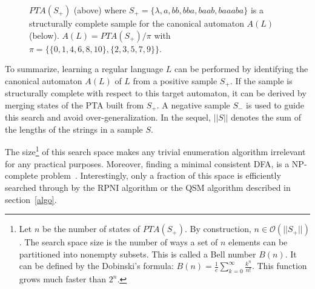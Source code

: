 \begin{figure}[H]
\begin{center}
\caption{$PTA(S_+)$ (above) where $S_+ = \{\lambda,a,bb,bba,baab,baaaba\}$ is a structurally complete sample 
for the canonical automaton $A(L)$ (below). $A(L) = PTA(S_+)/\pi$ with $\pi=\{\{0,1,4,6,8,10\},\{2,3,5,7,9\}\}$.\label{fig:pta:quotient}}
\end{center}
\end{figure}

To summarize, learning a regular language $L$ can be performed by identifying the canonical automaton $A(L)$ of $L$ from a positive sample $S_+$. If the sample is structurally complete with respect to this target automaton, it can be derived by merging states of the PTA built from $S_+$. A negative sample $S_-$ is used to guide this search and avoid over-generalization. In the sequel, $||S||$ denotes the sum of the lengths of the strings in a sample $S$.

The size\footnote{Let $n$ be the number of states of $PTA(S_+)$. By construction, $n \in \mathcal{O}(||S_+||)$. The search space size is the number of ways a set of $n$ elements can be partitioned into nonempty subsets. This is called a Bell number $B(n)$. It can be defined by the Dobinski's formula: $B(n) = \frac{1}{e} \sum_{k=0}^{\infty} \frac{k^n}{n!}$. This function grows much faster than $2^n$.} of this search space makes any trivial enumeration algorithm irrelevant for any practical purposes. Moreover, finding a minimal consistent DFA, is a NP-complete problem~\cite{Gold:1978,Angluin:1978}. Interestingly, only a fraction of this space is efficiently searched through by the RPNI algorithm or the \textsc{QSM} algorithm described in section~\ref{algo}.

